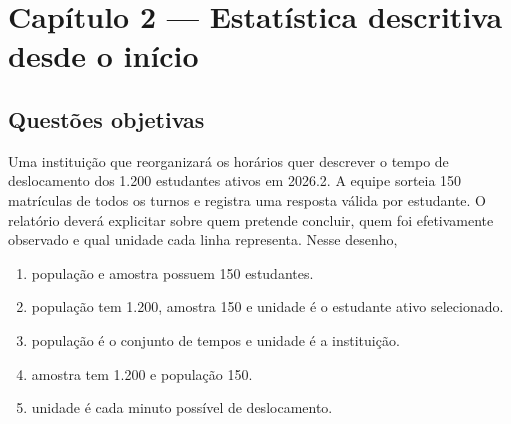 \section{Capítulo 2 --- Estatística descritiva desde o início}

\subsection{Questões objetivas}
\TextoBase Uma instituição que reorganizará os horários quer descrever o tempo de deslocamento dos 1.200 estudantes ativos em 2026.2. A equipe sorteia 150 matrículas de todos os turnos e registra uma resposta válida por estudante. O relatório deverá explicitar sobre quem pretende concluir, quem foi efetivamente observado e qual unidade cada linha representa.
\FonteDidatica
\Comando Nesse desenho,
\begin{enumerate}[label=\Alph*)]\item população e amostra possuem 150 estudantes.\item população tem 1.200, amostra 150 e unidade é o estudante ativo selecionado.\item população é o conjunto de tempos e unidade é a instituição.\item amostra tem 1.200 e população 150.\item unidade é cada minuto possível de deslocamento.\end{enumerate}

